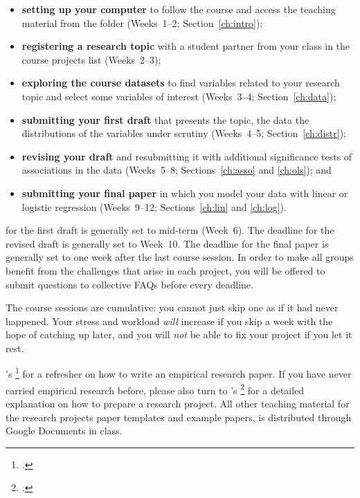 \begin{enumerate}
    \begin{itemize}
      \item \textbf{setting up your computer} to follow the course and access the teaching material from the \SRQM folder (Weeks~1--2; Section~\ref{ch:intro});%
      \item \textbf{registering a research topic} with a student partner from your class in the course projects list (Weeks~2--3);%
      \item \textbf{exploring the course datasets} to find variables related to your research topic and select some variables of interest (Weeks~3--4; Section~\ref{ch:data});%
      \item \textbf{submitting your first draft} that presents the topic, the data the distributions of the variables under scrutiny (Weeks~4--5; Section~\ref{ch:distr});%
      \item \textbf{revising your draft} and resubmitting it with additional significance tests of associations in the data (Weeks~5--8; Sections~\ref{ch:asso} and \ref{ch:ols}); and%
      \item \textbf{submitting your final paper} in which you model your data with linear or logistic regression (Weeks~9--12; Sections~\ref{ch:lin} and \ref{ch:log}).%
    \end{itemize}

     for the first draft is generally set to mid-term (Week~6). The deadline for the revised draft is generally set to Week~10. The deadline for the final paper is generally set to one week after the last course session. In order to make all groups benefit from the challenges that arise in each project, you will be offered to submit questions to collective FAQs before every deadline.%

     The course sessions are cumulative: you cannot just skip one as if it had never happened. Your stress and workload \emph{will} increase if you skip a week with the hope of catching up later, and you will \emph{not} be able to fix your project if you let it rest.%

		 \citeauthor{White:2005a}'s %
      \footcite{White:2005a} %
      for a refresher on how to write an empirical research paper. If you have never carried empirical research before, please also turn to \citeauthor{BoothWilliams:2003v}'s %
      \footcite{BoothWilliams:2003v} %
      for a detailed explanation on how to prepare a research project. All other teaching material for the research projects paper templates and example papers, is distributed through Google Documents in class.%


\end{enumerate}
